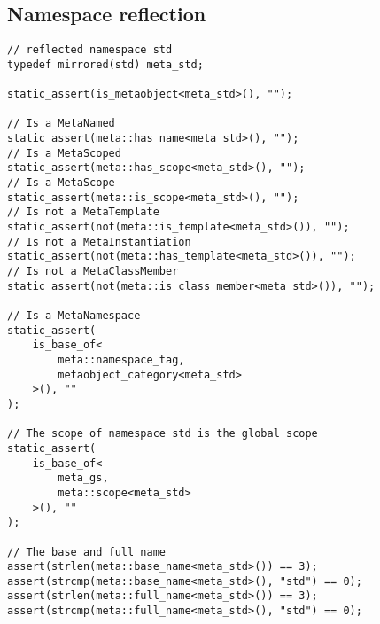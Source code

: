 \subsection{Namespace reflection}

\begin{verbatim}
// reflected namespace std
typedef mirrored(std) meta_std;

static_assert(is_metaobject<meta_std>(), "");

// Is a MetaNamed
static_assert(meta::has_name<meta_std>(), "");
// Is a MetaScoped
static_assert(meta::has_scope<meta_std>(), "");
// Is a MetaScope
static_assert(meta::is_scope<meta_std>(), "");
// Is not a MetaTemplate
static_assert(not(meta::is_template<meta_std>()), "");
// Is not a MetaInstantiation
static_assert(not(meta::has_template<meta_std>()), "");
// Is not a MetaClassMember
static_assert(not(meta::is_class_member<meta_std>()), "");

// Is a MetaNamespace
static_assert(
	is_base_of<
		meta::namespace_tag,
		metaobject_category<meta_std>
	>(), ""
);

// The scope of namespace std is the global scope
static_assert(
	is_base_of<
		meta_gs,
		meta::scope<meta_std>
	>(), ""
);

// The base and full name
assert(strlen(meta::base_name<meta_std>()) == 3);
assert(strcmp(meta::base_name<meta_std>(), "std") == 0);
assert(strlen(meta::full_name<meta_std>()) == 3);
assert(strcmp(meta::full_name<meta_std>(), "std") == 0);
\end{verbatim}
